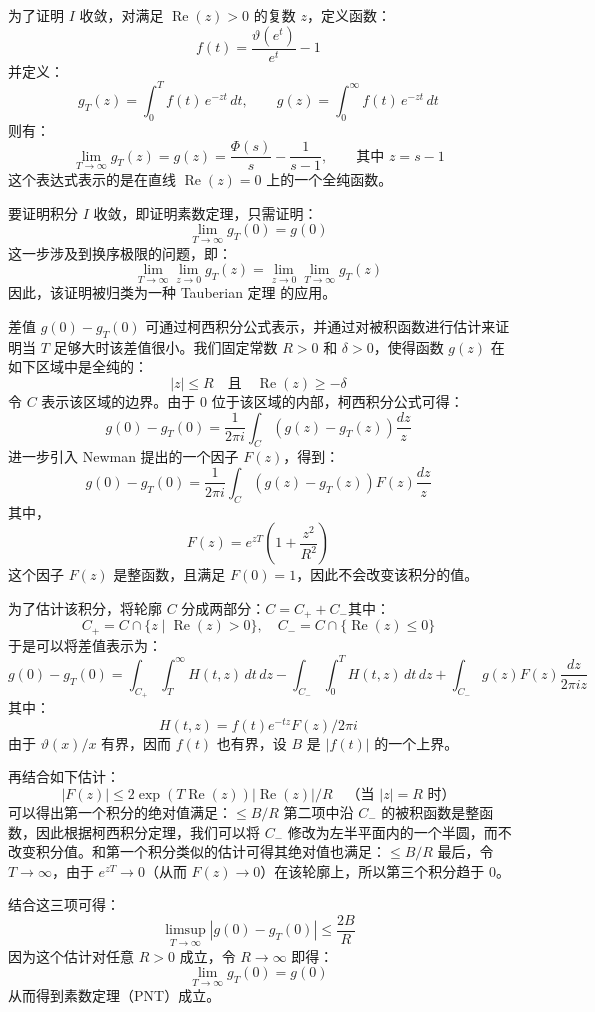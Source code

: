为了证明 $I$ 收敛，对满足 $\operatorname{Re}(z) > 0$ 的复数 $z$，定义函数：
$$
f(t) = \frac{\vartheta(e^{t})}{e^{t}} - 1~
$$
并定义：
$$
g_T(z) = \int_{0}^{T} f(t)\, e^{-zt} \, dt,\quad\quad g(z) = \int_{0}^{\infty} f(t)\, e^{-zt} \, dt~
$$
则有：
$$
\lim_{T \to \infty} g_T(z) = g(z) = \frac{\Phi(s)}{s} - \frac{1}{s - 1},\quad\quad \text{其中 } z = s - 1~
$$
这个表达式表示的是在直线 $\operatorname{Re}(z) = 0$ 上的一个全纯函数。

要证明积分 $I$ 收敛，即证明素数定理，只需证明：
$$
\lim_{T \to \infty} g_T(0) = g(0)~
$$
这一步涉及到换序极限的问题，即：
$$
\lim_{T \to \infty} \lim_{z \to 0} g_T(z) = \lim_{z \to 0} \lim_{T \to \infty} g_T(z)~
$$
因此，该证明被归类为一种 Tauberian 定理 的应用。

差值 $g(0) - g_T(0)$ 可通过柯西积分公式表示，并通过对被积函数进行估计来证明当 $T$ 足够大时该差值很小。我们固定常数 $R > 0$ 和 $\delta > 0$，使得函数 $g(z)$ 在如下区域中是全纯的：
$$
|z| \leq R \quad \text{且} \quad \operatorname{Re}(z) \geq -\delta~
$$
令 $C$ 表示该区域的边界。由于 $0$ 位于该区域的内部，柯西积分公式可得：
$$
g(0) - g_T(0) = \frac{1}{2\pi i} \int_C \left( g(z) - g_T(z) \right) \frac{dz}{z}~
$$
进一步引入 Newman 提出的一个因子 $F(z)$，得到：
$$
g(0) - g_T(0) = \frac{1}{2\pi i} \int_C \left( g(z) - g_T(z) \right) F(z) \frac{dz}{z}~
$$
其中，
$$
F(z) = e^{zT} \left( 1 + \frac{z^2}{R^2} \right)~
$$
这个因子 $F(z)$ 是整函数，且满足 $F(0) = 1$，因此不会改变该积分的值。

为了估计该积分，将轮廓 $C$ 分成两部分：$C = C_+ + C_-$其中：
$$
C_+ = C \cap \{ z \mid \operatorname{Re}(z) > 0 \}, \quad C_- = C \cap \{ \operatorname{Re}(z) \leq 0 \}~
$$
于是可以将差值表示为：
$$
g(0) - g_T(0) = \int_{C_+} \int_T^\infty H(t, z)\,dt\,dz - \int_{C_-} \int_0^T H(t, z)\,dt\,dz + \int_{C_-} g(z)F(z) \frac{dz}{2\pi i z}~
$$
其中：
$$
H(t, z) = f(t) e^{-tz} F(z)/2\pi i~
$$
由于 $\vartheta(x)/x$ 有界，因而 $f(t)$ 也有界，设 $B$ 是 $|f(t)|$ 的一个上界。

再结合如下估计：
$$
|F(z)| \leq 2 \exp(T \operatorname{Re}(z)) |\operatorname{Re}(z)|/R \quad \text{（当 } |z| = R \text{ 时）}~
$$
可以得出第一个积分的绝对值满足：$\leq B/R$ 第二项中沿 $C_-$ 的被积函数是整函数，因此根据柯西积分定理，我们可以将 $C_-$ 修改为左半平面内的一个半圆，而不改变积分值。和第一个积分类似的估计可得其绝对值也满足：$\leq B/R$ 最后，令 $T \to \infty$，由于 $e^{zT} \to 0$（从而 $F(z) \to 0$）在该轮廓上，所以第三个积分趋于 0。

结合这三项可得：
$$
\limsup_{T \to \infty} \left| g(0) - g_T(0) \right| \leq \frac{2B}{R}~
$$
因为这个估计对任意 $R > 0$ 成立，令 $R \to \infty$ 即得：
$$
\lim_{T \to \infty} g_T(0) = g(0)~
$$
从而得到素数定理（PNT）成立。
